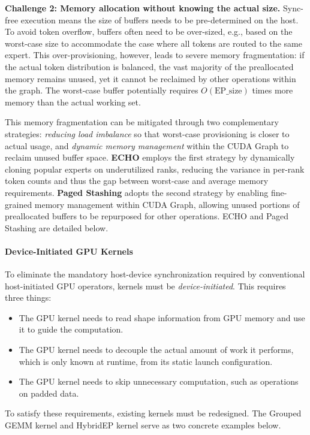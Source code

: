 \documentclass[10pt,logo,copyright]{nvidiatechreport}
\begin{document}
\textbf{Challenge 2: Memory allocation without knowing the actual size.}
Sync-free execution means the size of buffers needs to be pre-determined on the host. To avoid token overflow, buffers often need to be over-sized, e.g., based on the worst-case size to accommodate the case where all tokens are routed to the same expert. This over-provisioning, however, leads to severe memory fragmentation: if the actual token distribution is balanced, the vast majority of the preallocated memory remains unused, yet it cannot be reclaimed by other operations within the graph. The worst-case buffer potentially requires $O(\text{EP\_size})$ times more memory than the actual working set.

This memory fragmentation can be mitigated through two complementary strategies: \emph{reducing load imbalance} so that worst-case provisioning is closer to actual usage, and \emph{dynamic memory management} within the CUDA Graph to reclaim unused buffer space. \textbf{ECHO} employs the first strategy by dynamically cloning popular experts on underutilized ranks, reducing the variance in per-rank token counts and thus the gap between worst-case and average memory requirements. \textbf{Paged Stashing} adopts the second strategy by enabling fine-grained memory management within CUDA Graph, allowing unused portions of preallocated buffers to be repurposed for other operations. ECHO and Paged Stashing are detailed below.

\paragraph{Device-Initiated GPU Kernels}
\label{sec:device-init}

To eliminate the mandatory host-device synchronization required by conventional host-initiated GPU operators, kernels must be \emph{device-initiated}. This requires three things:
\begin{itemize}
\item[i.] The GPU kernel needs to read shape information from GPU memory and use it to guide the computation.
\item[ii.] The GPU kernel needs to decouple the actual amount of work it performs, which is only known at runtime, from its static launch configuration.
\item[iii.] The GPU kernel needs to skip unnecessary computation, such as operations on padded data.
\end{itemize}
To satisfy these requirements, existing kernels must be redesigned. The Grouped GEMM kernel and HybridEP kernel serve as two concrete examples below.
\end{document}
